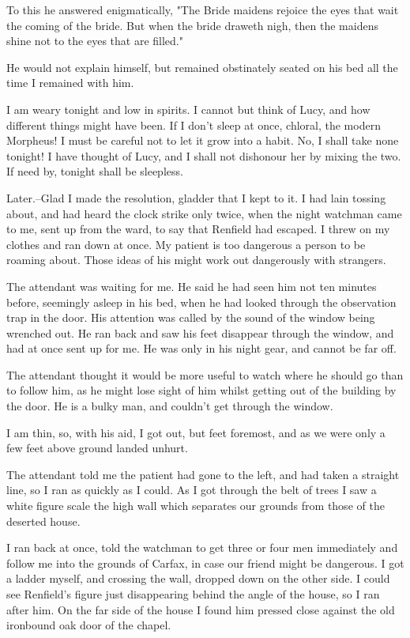 To this he answered enigmatically, "The Bride maidens rejoice the eyes that wait the coming of the bride. But when the bride draweth nigh, then the maidens shine not to the eyes that are filled." 

He would not explain himself, but remained obstinately seated on his bed all the time I remained with him. 

I am weary tonight and low in spirits. I cannot but think of Lucy, and how different things might have been. If I don't sleep at once, chloral, the modern Morpheus! I must be careful not to let it grow into a habit. No, I shall take none tonight! I have thought of Lucy, and I shall not dishonour her by mixing the two. If need by, tonight shall be sleepless. 

Later.--Glad I made the resolution, gladder that I kept to it. I had lain tossing about, and had heard the clock strike only twice, when the night watchman came to me, sent up from the ward, to say that Renfield had escaped. I threw on my clothes and ran down at once. My patient is too dangerous a person to be roaming about. Those ideas of his might work out dangerously with strangers. 

The attendant was waiting for me. He said he had seen him not ten minutes before, seemingly asleep in his bed, when he had looked through the observation trap in the door. His attention was called by the sound of the window being wrenched out. He ran back and saw his feet disappear through the window, and had at once sent up for me. He was only in his night gear, and cannot be far off. 

The attendant thought it would be more useful to watch where he should go than to follow him, as he might lose sight of him whilst getting out of the building by the door. He is a bulky man, and couldn't get through the window. 

I am thin, so, with his aid, I got out, but feet foremost, and as we were only a few feet above ground landed unhurt. 

The attendant told me the patient had gone to the left, and had taken a straight line, so I ran as quickly as I could. As I got through the belt of trees I saw a white figure scale the high wall which separates our grounds from those of the deserted house. 

I ran back at once, told the watchman to get three or four men immediately and follow me into the grounds of Carfax, in case our friend might be dangerous. I got a ladder myself, and crossing the wall, dropped down on the other side. I could see Renfield's figure just disappearing behind the angle of the house, so I ran after him. On the far side of the house I found him pressed close against the old ironbound oak door of the chapel. 

